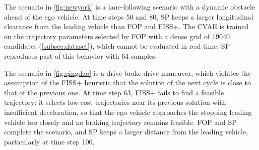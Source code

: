 The scenario in \autoref{fig:newyork} is a lane-following scenario with a dynamic obstacle ahead of the ego vehicle.
At time steps 50 and 80, SP keeps a larger longitudinal clearance from the leading vehicle than FOP and FISS+.
The CVAE is trained on the trajectory parameters selected by FOP with a dense grid of 19040 candidates (\autoref{subsec:dataset}), which cannot be evaluated in real time; SP reproduces part of this behavior with 64 samples.

The scenario in \autoref{fig:qingdao} is a drive-brake-drive maneuver, which violates the assumption of the FISS+ heuristic that the solution of the next cycle is close to that of the previous one.
At time step 63, FISS+ fails to find a feasible trajectory: it selects low-cost trajectories near its previous solution with insufficient deceleration, so that the ego vehicle approaches the stopping leading vehicle too closely and no braking trajectory remains feasible.
FOP and SP complete the scenario, and SP keeps a larger distance from the leading vehicle, particularly at time step 100.

